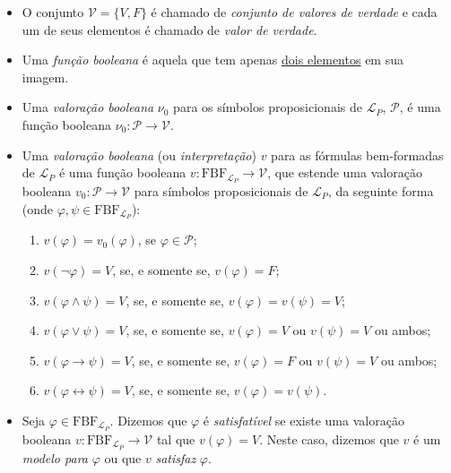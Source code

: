         \begin{itemize}[left=0.5cm, align=left, nosep]
            \item O conjunto $\mathcal{V} = \{V, F\}$ é chamado de \textit{conjunto de valores de verdade} e cada um 
            de seus elementos é chamado de \textit{valor de verdade}.
        
            \item Uma \textit{função booleana} é aquela que tem apenas \underline{dois elementos} em sua imagem.

            \item Uma \textit{valoração booleana} $\nu_0$ para os símbolos proposicionais de $\mathcal{L}_P$, 
            $\mathcal{P}$, é uma função booleana $\nu_0 : \mathcal{P} \longrightarrow \mathcal{V}$.
    
            \item Uma \textit{valoração booleana} (ou \textit{interpretação}) $v$ para as fórmulas bem-formadas de 
            $\mathcal{L}_P$ é uma função booleana $v : \text{FBF}_{\mathcal{L}_P} \longrightarrow \mathcal{V}$, que estende uma 
            valoração booleana $v_0 : \mathcal{P} \longrightarrow \mathcal{V}$ para símbolos proposicionais de $\mathcal{L}_P$, 
            da seguinte forma (onde $\varphi, \psi \in \text{FBF}_{\mathcal{L}_P}$):
            \begin{enumerate}[left=0.5cm, align=left, nosep]
                \item $v(\varphi) = v_0(\varphi)$, se $\varphi \in \mathcal{P}$;
                \item $v(\neg \varphi) = V$, se, e somente se, $v(\varphi) = F$;
                \item $v(\varphi \wedge \psi) = V$, se, e somente se, $v(\varphi) = v(\psi) = V$;
                \item $v(\varphi \vee \psi) = V$, se, e somente se, $v(\varphi) = V$ ou $v(\psi) = V$ ou ambos;
                \item $v(\varphi \rightarrow \psi) = V$, se, e somente se, $v(\varphi) = F$ ou $v(\psi) = V$ ou ambos;
                \item $v(\varphi \leftrightarrow \psi) = V$, se, e somente se, $v(\varphi) = v(\psi)$.
            \end{enumerate}
    
            \item Seja $\varphi \in \text{FBF}_{\mathcal{L}_P}$. Dizemos que $\varphi$ é \textit{satisfatível} se existe uma 
            valoração booleana $v : \text{FBF}_{\mathcal{L}_P} \longrightarrow \mathcal{V}$ tal que $v(\varphi) = V$. Neste caso, 
            dizemos que $v$ é um \textit{modelo para} $\varphi$ ou que $v$ \textit{satisfaz} $\varphi$.


\end{itemize}
